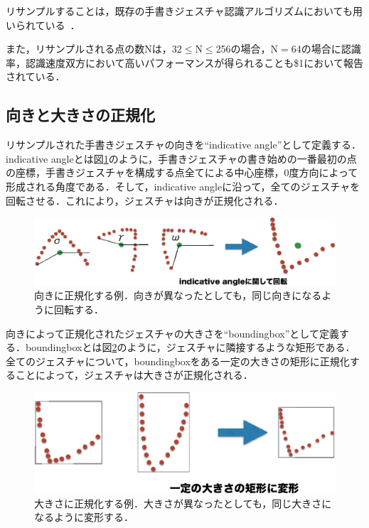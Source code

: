 リサンプルすることは，既存の手書きジェスチャ認識アルゴリズムにおいても用いられている~\cite{Plamondon:2000:OOH:331097.331275, Tappert:1990:SAO:83123.83137, Kristensson:2004:SLV:1029632.1029640, Zhai:2003:SWS:642611.642630, Tappert:1982:CSR:1664966.1664979}．


また，リサンプルされる点の数Nは，32$\leq$N$\leq$256の場合，N$=$64の場合に認識率，認識速度双方において高いパフォーマンスが得られることも\$1において報告されている．

\subsection{向きと大きさの正規化}
リサンプルされた手書きジェスチャの向きを``indicative angle''として定義する．indicative angleとは図\ref{fig:orientation}のように，手書きジェスチャの書き始めの一番最初の点の座標，手書きジェスチャを構成する点全てによる中心座標，0度方向によって形成される角度である．そして，indicative angleに沿って，全てのジェスチャを回転させる．これにより，ジェスチャは向きが正規化される．

\begin{figure} [!h]
\centering
\includegraphics [width=0.8\columnwidth]{img/orientation.eps}
\caption{向きに正規化する例．向きが異なったとしても，同じ向きになるように回転する．}
\label{fig:orientation}
\end{figure}

向きによって正規化されたジェスチャの大きさを``boundingbox''として定義する．boundingboxとは図\ref{fig:size}のように，ジェスチャに隣接するような矩形である．全てのジェスチャについて，boundingboxをある一定の大きさの矩形に正規化することによって，ジェスチャは大きさが正規化される．

\begin{figure} [!h]
\centering
\includegraphics [width=0.7\columnwidth]{img/size.eps}
\caption{大きさに正規化する例．大きさが異なったとしても，同じ大きさになるように変形する．}
\label{fig:size}
\end{figure}

